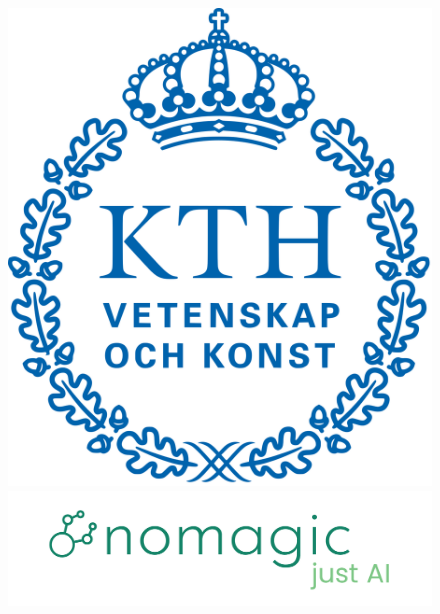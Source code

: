 
\thispagestyle{empty}
\setcounter{page}{0}
\setcounter{tocdepth}{2}

\newcommand{\pt}[4]{\dotnode(#2,#3){#1} \uput[#4](#2,#3){#1}}

\begin{center}

\begin{figure}[!htb]
    \centering
    \begin{minipage}{.5\textwidth}
        \centering
        \includegraphics[scale=0.08]{images/title/kth.png}
    \end{minipage}%
    \begin{minipage}{0.5\textwidth}
        \centering
        \includegraphics[scale=0.08]{images/title/nomagic.png}
    \end{minipage}
\end{figure}


\end{center}

